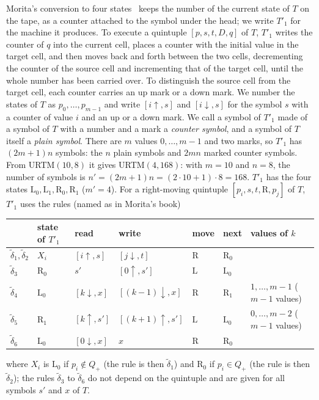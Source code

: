 \documentclass{article}
\theoremstyle{definition}
\theoremstyle{remark}
\newcommand{\rmL}{\mathrm{L}}
\newcommand{\rmR}{\mathrm{R}}
\begin{document}
Morita's conversion to four states~\cite[Sect.~5.3.4]{Morita17} keeps the number of the current state of $T$ on the tape, as a counter attached to the symbol under the head; we write $T'_1$ for the machine it produces.
To execute a quintuple $[p,s,t,D,q]$ of $T$, $T'_1$ writes the counter of $q$ into the current cell, places a counter with the initial value in the target cell, and then moves back and forth between the two cells, decrementing the counter of the source cell and incrementing that of the target cell, until the whole number has been carried over.
To distinguish the source cell from the target cell, each counter carries an up mark or a down mark.
We number the states of $T$ as $p_0,\dots,p_{m-1}$ and write $[i{\uparrow},s]$ and $[i{\downarrow},s]$ for the symbol $s$ with a counter of value $i$ and an up or a down mark.
We call a symbol of $T'_1$ made of a symbol of $T$ with a number and a mark a \emph{counter symbol}, and a symbol of $T$ itself a \emph{plain symbol}.
There are $m$ values $0,\dots,m-1$ and two marks, so $T'_1$ has $(2m+1)n$ symbols: the $n$ plain symbols and $2mn$ marked counter symbols.
From URTM$(10,8)$ it gives URTM$(4,168)$: with $m=10$ and $n=8$, the number of symbols is $n'=(2m+1)n=(2\cdot 10+1)\cdot 8=168$.
$T'_1$ has the four states $\mathrm{L}_0,\mathrm{L}_1,\mathrm{R}_0,\mathrm{R}_1$ ($m'=4$).
For a right-moving quintuple $[p_i,s,t,\rmR,p_j]$ of $T$, $T'_1$ uses the rules (named as in Morita's book)
\begin{center}
\small
\begin{tabular}{lllllll}
\toprule
& state of $T'_1$ & read & write & move & next & values of $k$ \\
\midrule
$\tilde\delta_1,\tilde\delta_2$ & $X_i$ & $[i{\uparrow},s]$ & $[j{\downarrow},t]$ & $\rmR$ & $\rmR_0$ & \\
$\tilde\delta_3$ & $\rmR_0$ & $s'$ & $[0{\uparrow},s']$ & $\rmL$ & $\rmL_0$ & \\
$\tilde\delta_4$ & $\rmL_0$ & $[k{\downarrow},x]$ & $[(k-1){\downarrow},x]$ & $\rmR$ & $\rmR_1$ & $1,\dots,m-1$ ($m-1$ values) \\
$\tilde\delta_5$ & $\rmR_1$ & $[k{\uparrow},s']$ & $[(k+1){\uparrow},s']$ & $\rmL$ & $\rmL_0$ & $0,\dots,m-2$ ($m-1$ values) \\
$\tilde\delta_6$ & $\rmL_0$ & $[0{\downarrow},x]$ & $x$ & $\rmR$ & $\rmR_0$ & \\
\bottomrule
\end{tabular}
\end{center}
where $X_i$ is $\rmL_0$ if $p_i\notin Q_+$ (the rule is then $\tilde\delta_1$) and $\rmR_0$ if $p_i\in Q_+$ (the rule is then $\tilde\delta_2$); the rules $\tilde\delta_3$ to $\tilde\delta_6$ do not depend on the quintuple and are given for all symbols $s'$ and $x$ of $T$.
\end{document}
